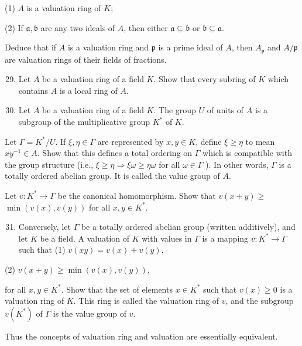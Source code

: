 \documentclass{standalone}
\theoremstyle{definition}
\theoremstyle{remark}
\begin{document}
(1) $A$ is a valuation ring of $K$;

(2) If $\mathfrak{a}, \mathfrak{b}$ are any two ideals of $A$, then either $\mathfrak{a} \subseteq \mathfrak{b}$ or $\mathfrak{b} \subseteq \mathfrak{a}$.

Deduce that if $A$ is a valuation ring and $\mathfrak{p}$ is a prime ideal of $A$, then $A_{\mathfrak{p}}$ and $A / \mathfrak{p}$ are valuation rings of their fields of fractions.

\begin{enumerate}
  \setcounter{enumi}{28}
  \item Let $A$ be a valuation ring of a field $K$. Show that every subring of $K$ which contains $A$ is a local ring of $A$.

  \item Let $A$ be a valuation ring of a field $K$. The group $U$ of units of $A$ is a subgroup of the multiplicative group $K^{*}$ of $K$.

\end{enumerate}

Let $\Gamma=K^{*} / U$. If $\xi, \eta \in \Gamma$ are represented by $x, y \in K$, define $\xi \geqslant \eta$ to mean $x y^{-1} \in A$. Show that this defines a total ordering on $\Gamma$ which is compatible with the group structure (i.e., $\xi \geqslant \eta \Rightarrow \xi \omega \geqslant \eta \omega$ for all $\omega \in \Gamma$ ). In other words, $\Gamma$ is a totally ordered abelian group. It is called the value group of $A$.

Let $v: K^{*} \rightarrow \Gamma$ be the canonical homomorphism. Show that $v(x+y) \geqslant$ $\min (v(x), v(y))$ for all $x, y \in K^{*}$.

\begin{enumerate}
  \setcounter{enumi}{30}
  \item Conversely, let $\Gamma$ be a totally ordered abelian group (written additively), and let $K$ be a field. A valuation of $K$ with values in $\Gamma$ is a mapping $v: K^{*} \rightarrow \Gamma$ such that (1) $v(x y)=v(x)+v(y)$,
\end{enumerate}

(2) $v(x+y) \geqslant \min (v(x), v(y))$,

for all $x, y \in K^{*}$. Show that the set of elements $x \in K^{*}$ such that $v(x) \geqslant 0$ is a valuation ring of $K$. This ring is called the valuation ring of $v$, and the subgroup $v\left(K^{*}\right)$ of $\Gamma$ is the value group of $v$.

Thus the concepts of valuation ring and valuation are essentially equivalent.
\end{document}
